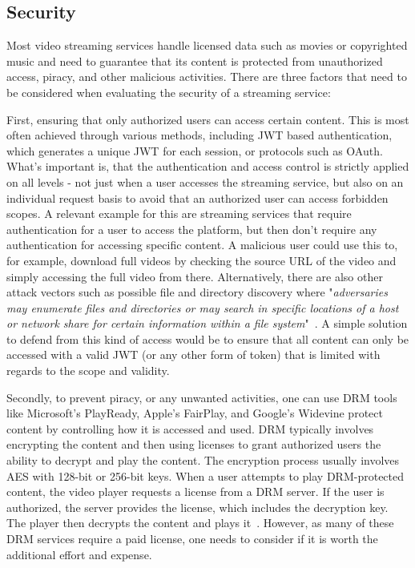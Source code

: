 \subsection{Security}

Most video streaming services handle licensed data such as movies or copyrighted music and need to guarantee that its content is protected from unauthorized access, piracy, and other malicious activities.
There are three factors that need to be considered when evaluating the security of a streaming service: 

First, ensuring that only authorized users can access certain content. This is most often achieved through various methods, including \ac{JWT} based authentication, which generates a unique \ac{JWT} for each session, or protocols such as OAuth. What's important is, that the authentication and access control is strictly applied on all levels - not just when a user accesses the streaming service, but also on an individual request basis to avoid that an authorized user can access forbidden scopes. A relevant example for this are streaming services that require authentication for a user to access the platform, but then don't require any authentication for accessing specific content. A malicious user could use this to, for example, download full videos by checking the source URL of the video and simply accessing the full video from there. Alternatively, there are also other attack vectors such as possible file and directory discovery where "\textit{adversaries may enumerate files and directories or may search in specific locations of a host or network share for certain information within a file system}"~\parencite{mitre}. A simple solution to defend from this kind of access would be to ensure that all content can only be accessed with a valid \ac{JWT} (or any other form of token) that is limited with regards to the scope and validity.

Secondly, to prevent piracy, or any unwanted activities, one can use \ac{DRM} tools like Microsoft's PlayReady, Apple's FairPlay, and Google's Widevine protect content by controlling how it is accessed and used. \ac{DRM} typically involves encrypting the content and then using licenses to grant authorized users the ability to decrypt and play the content. The encryption process usually involves \ac{AES} with 128-bit or 256-bit keys. When a user attempts to play \ac{DRM}-protected content, the video player requests a license from a \ac{DRM} server. If the user is authorized, the server provides the license, which includes the decryption key. The player then decrypts the content and plays it~\parencite{drm}. However, as many of these \ac{DRM} services require a paid license, one needs to consider if it is worth the additional effort and expense.

